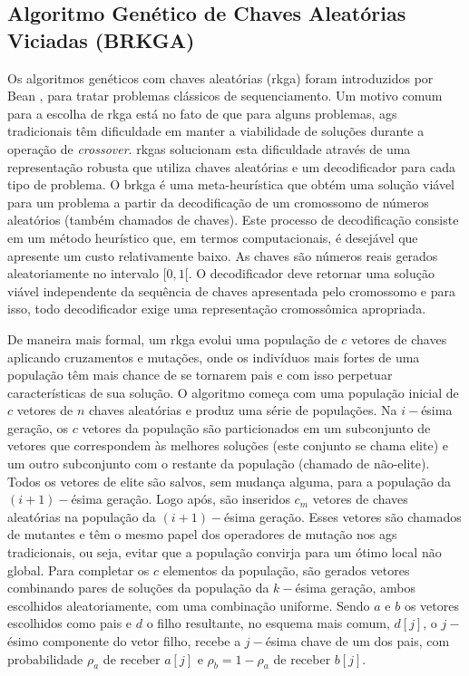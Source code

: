 \subsection{Algoritmo Genético de Chaves Aleatórias Viciadas (BRKGA)} \label{subsec:brkga}

Os  algoritmos  genéticos  com chaves  aleatórias  (\gls{rkga})  foram
introduzidos por Bean \cite{bean1994}, para tratar problemas clássicos
de sequenciamento.  Um motivo comum  para a escolha de \gls{rkga} está
no  fato de  que  para alguns  problemas,  \gls{ag}s tradicionais  têm
dificuldade em manter a viabilidade  de soluções durante a operação de
\textit{crossover}.  \gls{rkga}s  solucionam esta  dificuldade através
de  uma  representação robusta  que  utiliza  chaves aleatórias  e  um
decodificador  para  cada  tipo  de problema.   O  \gls{brkga}  é  uma
meta-heurística que obtém uma solução viável para um problema a partir
da  decodificação  de  um  cromossomo de  números  aleatórios  (também
chamados de  chaves). Este  processo de  decodificação consiste  em um
método  heurístico  que, em  termos  computacionais,  é desejável  que
apresente um custo  relativamente baixo.  As chaves  são números reais
gerados aleatoriamente  no intervalo  $[0, 1[$.  O  decodificador deve
    retornar uma  solução viável  independente da sequência  de chaves
    apresentada pelo cromossomo e  para isso, todo decodificador exige
    uma representação cromossômica apropriada.

De maneira  mais formal, um  \gls{rkga} evolui uma  população de $c$  vetores de
chaves aplicando cruzamentos  e mutações, onde os indivíduos mais  fortes de uma
população  têm   mais  chance  de  se   tornarem  pais  e  com   isso  perpetuar
características de sua solução. O algoritmo  começa com uma população inicial de
$c$  vetores de  $n$ chaves  aleatórias  e produz  uma série  de populações.  Na
$i-$ésima  geração,  os  $c$  vetores  da  população  são  particionados  em  um
subconjunto de vetores  que correspondem às melhores soluções  (este conjunto se
chama elite)  e um  outro subconjunto  com o restante  da população  (chamado de
não-elite). Todos  os vetores de  elite são salvos,  sem mudança alguma,  para a
população da $(i + 1)-$ésima geração.  Logo após, são inseridos $c_m$ vetores de
chaves aleatórias  na população da  $(i +  1)-$ésima geração. Esses  vetores são
chamados de mutantes e têm o mesmo papel dos operadores de mutação nos \gls{ag}s
tradicionais, ou seja,  evitar que a população convirja para  um ótimo local não
global.  Para completar  os  $c$  elementos da  população,  são gerados  vetores
combinando pares de soluções da população da $k-$ésima geração, ambos escolhidos
aleatoriamente,  com  uma  combinação  uniforme.  Sendo $a$  e  $b$  os  vetores
escolhidos como pais e $d$ o filho  resultante, no esquema mais comum, $d[j]$, o
$j-$ésimo componente  do vetor filho, recebe  a $j-$ésima chave de  um dos pais,
com probabilidade $\rho_a$ de receber $a[j]$ e  $\rho_b = 1 - \rho_a$ de receber
$b[j]$.

